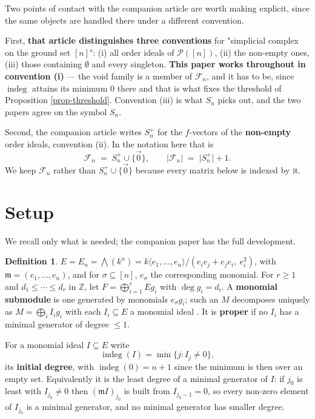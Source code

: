 \documentclass[11pt, a4paper, abstract=yes]{scrartcl}
\theoremstyle{definition}
\newtheorem{definition}{Definition}
\theoremstyle{remark}
\theoremstyle{plain}
\newcommand{\indeg}{\operatorname{indeg}}
\begin{document}
Two points of contact with the companion article are worth making explicit, since the same objects
are handled there under a different convention.

First, \textbf{\textbf{that article distinguishes three conventions}} for "simplicial complex on the ground set
\([n]\)": (i) all order ideals of \(\mathcal P([n])\), (ii) the non-empty ones, (iii) those containing
\(\emptyset\) and every singleton. \textbf{This paper works throughout in convention (i)} --- the void family
is a member of \(\mathcal F_n\), and it has to be, since \(\indeg\) attains its minimum \(0\) there and
that is what fixes the threshold of Proposition \ref{prop-threshold}. Convention (iii) is what \(S_n\)
picks out, and the two papers agree on the symbol \(S_n\).

Second, the companion article writes \(S_n^{+}\) for the \(f\)-vectors of the \textbf{non-empty} order
ideals, convention (ii). In the notation here that is
\begin{equation}\label{eq:Fn-vs-Splus}
  \mathcal F_n \;=\; S_n^{+}\cup\lbrace\vec 0\rbrace,\qquad
  \lvert\mathcal F_n\rvert \;=\; \lvert S_n^{+}\rvert+1 .
\end{equation}
We keep \(\mathcal F_n\) rather than \(S_n^{+}\cup\lbrace\vec0\rbrace\) because every matrix below is
indexed by it.
\section{Setup}
\label{sec-setup}
We recall only what is needed; the companion paper has the full development.

\begin{definition}
\(E=E_n=\bigwedge(k^n)=k\langle e_1,\dots,e_n\rangle/(e_ie_j+e_je_i,\ e_i^2)\), with
\(\mathfrak m=(e_1,\dots,e_n)\), and for \(\sigma\subseteq[n]\), \(e_\sigma\) the corresponding
monomial. For \(r\ge1\) and \(d_1\le\cdots\le d_r\) in \(\mathbb Z\), let
\(F=\bigoplus_{i=1}^rEg_i\) with \(\deg g_i=d_i\). A \textbf{monomial submodule} is one generated by
monomials \(e_\sigma g_i\); such an \(M\) decomposes uniquely as \(M=\bigoplus_iI_ig_i\) with each
\(I_i\subseteq E\) a monomial ideal \textcite[Definition 2.1]{AmataCrupi2020}. It is \textbf{proper} if no \(I_i\) has
a minimal generator of degree \(\le1\).

For a monomial ideal \(I\subseteq E\) write
\begin{equation}\label{eq:indeg-ideal}
  \indeg(I)=\min\lbrace j:I_j\ne0\rbrace ,
\end{equation}
its \textbf{initial degree}, with \(\indeg(0)=n+1\) since the minimum is then over an empty set.
Equivalently it is the least degree of a minimal generator of \(I\): if \(j_0\) is least with
\(I_{j_0}\ne0\) then \((\mathfrak mI)_{j_0}\) is built from \(I_{j_0-1}=0\), so every non-zero
element of \(I_{j_0}\) is a minimal generator, and no minimal generator has smaller degree.
\label{def-setup}
\end{definition}
\end{document}
